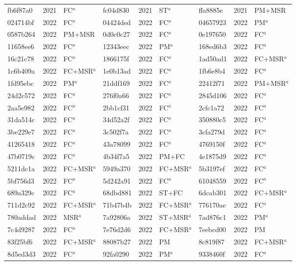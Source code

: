\begin{longtable}{lll@{\hspace{10pt}}lll@{\hspace{10pt}}lll}
fb6f87a0 & 2021 & FC$^{a}$ & fc04d830 & 2021 & ST$^{a}$ & ffa8885e & 2021 & PM+MSR \\
024714bf & 2022 & FC$^{a}$ & 04424ded & 2022 & FC$^{a}$ & 04657923 & 2022 & PM$^{a}$ \\
0587b264 & 2022 & PM+MSR & 0d0c0c27 & 2022 & FC$^{a}$ & 0e197650 & 2022 & FC$^{a}$ \\
11658ee6 & 2022 & FC$^{a}$ & 12343eec & 2022 & PM$^{a}$ & 168ed6b3 & 2022 & FC$^{a}$ \\
16c21c78 & 2022 & FC$^{a}$ & 1866175f & 2022 & FC$^{a}$ & 1ad50ad1 & 2022 & FC+MSR$^{a}$ \\
1c6b409a & 2022 & FC+MSR$^{a}$ & 1e0b13ad & 2022 & FC$^{a}$ & 1fb6e8b4 & 2022 & FC$^{a}$ \\
1fd95ebc & 2022 & PM$^{a}$ & 21ddf169 & 2022 & FC$^{a}$ & 22412f71 & 2022 & PM+MSR$^{a}$ \\
24d2c572 & 2022 & FC$^{a}$ & 276f0a66 & 2022 & FC$^{a}$ & 2845d106 & 2022 & FC$^{a}$ \\
2aa5e982 & 2022 & FC$^{a}$ & 2bb1cf31 & 2022 & FC$^{a}$ & 2cfc1a72 & 2022 & FC$^{a}$ \\
31da514c & 2022 & FC$^{a}$ & 34d52a2f & 2022 & FC$^{a}$ & 350880c5 & 2022 & FC$^{a}$ \\
3be229e7 & 2022 & FC$^{a}$ & 3c502f7a & 2022 & FC$^{a}$ & 3cfa279d & 2022 & FC$^{a}$ \\
41265418 & 2022 & FC$^{a}$ & 43a78099 & 2022 & FC$^{a}$ & 4769150f & 2022 & FC$^{a}$ \\
47b0719c & 2022 & FC$^{a}$ & 4b34f7a5 & 2022 & PM+FC & 4e1875d9 & 2022 & FC$^{a}$ \\
5211dc1a & 2022 & FC+MSR$^{a}$ & 5949a370 & 2022 & FC+MSR$^{a}$ & 5b3197ef & 2022 & FC$^{a}$ \\
5bf756d3 & 2022 & FC$^{a}$ & 5d242a91 & 2022 & FC$^{a}$ & 61048559 & 2022 & FC$^{a}$ \\
689a329c & 2022 & FC$^{a}$ & 68dbd881 & 2022 & ST+FC & 6dcab301 & 2022 & FC+MSR$^{a}$ \\
711d2c92 & 2022 & FC+MSR$^{a}$ & 71b47b4b & 2022 & FC+MSR$^{a}$ & 776170ae & 2022 & FC$^{a}$ \\
780addad & 2022 & MSR$^{a}$ & 7a92806a & 2022 & ST+MSR$^{a}$ & 7ad876c1 & 2022 & PM$^{a}$ \\
7c4d9287 & 2022 & FC$^{a}$ & 7e76d2d6 & 2022 & FC+MSR$^{a}$ & 7eebcd00 & 2022 & PM \\
83f25bf6 & 2022 & FC+MSR$^{a}$ & 88087b27 & 2022 & PM & 8c819f87 & 2022 & FC+MSR$^{a}$ \\
8d5ed3d3 & 2022 & FC$^{a}$ & 92fa0290 & 2022 & PM$^{a}$ & 9338460f & 2022 & FC$^{a}$ \\

\end{longtable}
